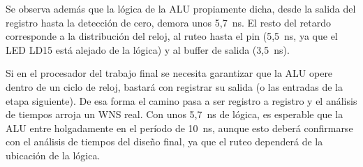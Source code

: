 Se observa además que la lógica de la ALU propiamente dicha, desde la salida del registro hasta la detección de cero, demora unos 5,7~ns. El resto del retardo corresponde a la distribución del reloj, al ruteo hasta el pin (5,5~ns, ya que el LED LD15 está alejado de la lógica) y al buffer de salida (3,5~ns).

Si en el procesador del trabajo final se necesita garantizar que la ALU opere dentro de un ciclo de reloj, bastará con registrar su salida (o las entradas de la etapa siguiente). De esa forma el camino pasa a ser registro a registro y el análisis de tiempos arroja un WNS real. Con unos 5,7~ns de lógica, es esperable que la ALU entre holgadamente en el período de 10~ns, aunque esto deberá confirmarse con el análisis de tiempos del diseño final, ya que el ruteo dependerá de la ubicación de la lógica.
